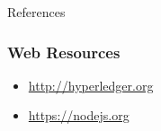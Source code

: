\documentclass[pdf,table]{beamer}
\begin{document}
\begin{frame}[allowframebreaks]{References}
	\printbibliography
\end{frame}
	
\begin{frame}
	\frametitle{Web Resources}
	\begin{itemize}
	\item \url{http://hyperledger.org}
	\item \url{https://nodejs.org}
	\end{itemize}
\end{frame}
\end{document}
